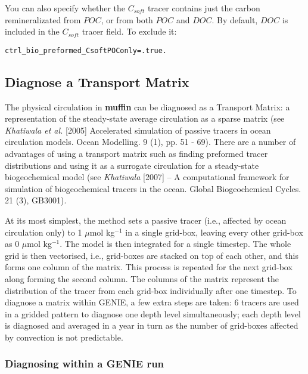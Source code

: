 \documentclass[11pt,fleqn]{book} %
\begin{document}
You can also specify whether the \(C_{soft}\) tracer contains just the carbon remineralizated from \(POC\), or from both \(POC\) and \(DOC\). By default,  \(DOC\) is included in the \(C_{soft}\) tracer field. To exclude it:

\texttt{ctrl\_bio\_preformed\_CsoftPOConly=.true.}

%
\subsection*{Diagnose a Transport Matrix}
\vspace{1mm}

The physical circulation in \textbf{muffin} can be diagnosed as a Transport Matrix: a representation of the steady-state average circulation as a sparse matrix (see \textit{Khatiwala et al.} [2005] Accelerated simulation of passive tracers in ocean circulation models. Ocean Modelling. 9 (1), pp. 51 - 69). There are a number of advantages of using a transport matrix such as finding preformed tracer distributions and using it as a surrogate circulation for a steady-state biogeochemical model (see \textit{Khatiwala} [2007] -- A computational framework for simulation of biogeochemical tracers in the ocean. Global Biogeochemical Cycles. 21 (3), GB3001).

At its most simplest, the method sets a passive tracer (i.e., affected by ocean circulation only) to 1 $\mu$mol kg$^{-1}$ in a single grid-box, leaving every other grid-box as 0 $\mu$mol kg$^{-1}$. The model is then integrated for a single timestep. The whole grid is then vectorised, i.e., grid-boxes are stacked on top of each other, and this forms one column of the matrix. This process is repeated for the next grid-box along forming the second column. The columns of the matrix represent the distribution of the tracer from each grid-box individually after one timestep. To diagnose a matrix within GENIE, a few extra steps are taken: 6 tracers are used in a gridded pattern to diagnose one depth level simultaneously; each depth level is diagnosed and averaged in a year in turn as the number of grid-boxes affected by convection is not predictable. 

%
\subsubsection{Diagnosing within a GENIE run} 
\vspace{1mm}
\end{document}
